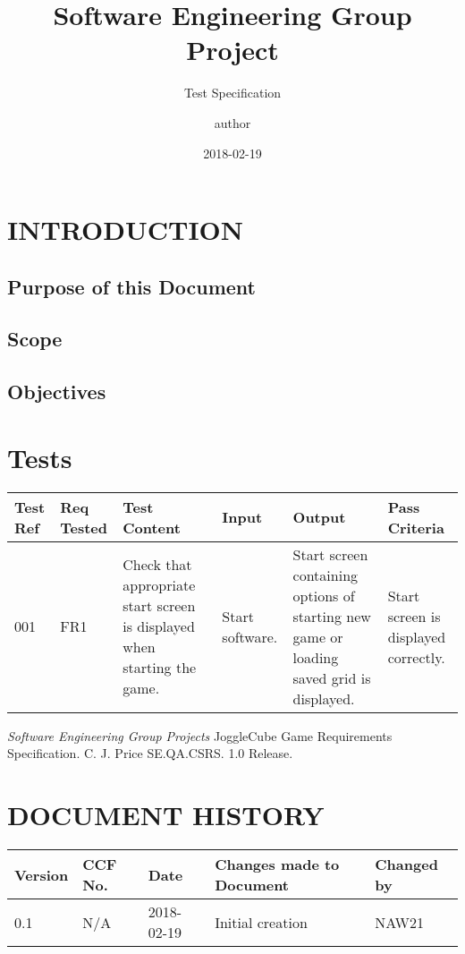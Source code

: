 \documentclass{project}
\begin{document}
\title{Software Engineering Group Project}
\subtitle{Test Specification}
\author{author}     
\date{2018-02-19}
\maketitle
\tableofcontents
\newpage

\section{INTRODUCTION}

\subsection{Purpose of this Document}

\subsection{Scope}

\subsection{Objectives}

\section{Tests}

\begin{tabular}{|p{0.7cm}|p{1cm}|p{3.5cm}|p{3.2cm}|p{3.5cm}|p{3.5cm}|}
\hline
Test Ref & Req Tested & Test Content & Input  & Output & Pass Criteria \\ \hline \hline
001 & FR1 & Check that appropriate start screen is displayed when starting the game. & Start software. & Start screen containing options of starting new game or loading saved grid is displayed. & Start screen 
is displayed correctly. \\ \hline
\end{tabular}

\clearpage
{}
\begin{thebibliography}{5}
 \emph{Software Engineering Group Projects}
JoggleCube Game Requirements Specification.
C. J. Price SE.QA.CSRS. 1.0 Release.
\end{thebibliography}
\clearpage
{}
\section*{DOCUMENT HISTORY}
\begin{tabular}{|l | l | l | l | l |}
\hline
Version & CCF No. & Date & Changes made to Document & Changed by \\
\hline
0.1 & N/A & 2018-02-19 & Initial creation & NAW21 \\
\hline
\end{tabular}
\label{thelastpage}
\end{document}
